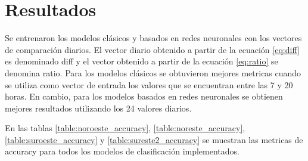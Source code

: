 \section{Resultados}
Se entrenaron los modelos clásicos y basados en redes neuronales con los vectores de comparación diarios. El vector diario obtenido a partir de la ecuación \ref{eq:diff} es denominado diff y el vector obtenido a partir de la ecuación \ref{eq:ratio} se denomina ratio. Para los modelos clásicos se obtuvieron mejores metricas cuando se utiliza como vector de entrada los valores que se encuentran entre las 7 y 20 horas. En cambio, para los modelos basados en redes neuronales se obtienen mejores resultados utilizando los 24 valores diarios.

En las tablas \ref{table:noroeste_accuracy}, \ref{table:noreste_accuracy}, \ref{table:suroeste_accuracy} y \ref{table:sureste2_accuracy} se muestran las metricas de accuracy para todos los modelos de clasificación implementados.

